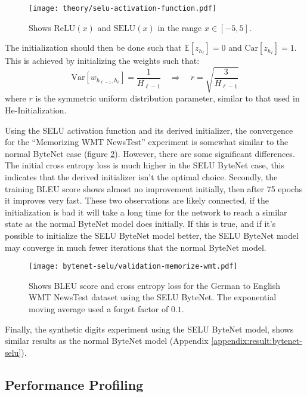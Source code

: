 \begin{figure}[h]
    \centering
    \texttt{[image: theory/selu-activation-function.pdf]}
    \caption{Shows $\mathrm{ReLU}(x)$ and $\mathrm{SELU}(x)$ in the range $x \in [-5, 5]$.}
    \label{fig:result:selu-bytenet:bytenet-selu-activation}
\end{figure}

The initialization should then be done such that $\mathbb{E}[z_{h_\ell}] = 0$ and $\mathrm{Car}[z_{h_\ell}] = 1$. This is achieved by initializing the weights such that:
\begin{equation}
\mathrm{Var}[w_{h_{\ell-1}, h_{\ell}}] = \frac{1}{H_{\ell-1}} \quad \Rightarrow \quad r = \sqrt{\frac{3}{H_{\ell-1}}}
\end{equation}
where $r$ is the symmetric uniform distribution parameter, similar to that used in He-Initialization.

Using the SELU activation function and its derived initializer, the convergence for the ``Memorizing WMT NewsTest'' experiment is somewhat similar to the normal ByteNet case (figure \ref{fig:result:selu-bytenet:bytenet-selu-wmt}). However, there are some significant differences. The initial cross entropy loss is much higher in the SELU ByteNet case, this indicates that the derived initializer isn't the optimal choice. Secondly, the training BLEU score shows almost no improvement initially, then after 75 epochs it improves very fast. These two observations are likely connected, if the initialization is bad it will take a long time for the network to reach a similar state as the normal ByteNet model does initially. If this is true, and if it's possible to initialize the SELU ByteNet model better, the SELU ByteNet model may converge in much fewer iterations that the normal ByteNet model.

\begin{figure}[h]
    \centering
    \texttt{[image: bytenet-selu/validation-memorize-wmt.pdf]}
    \caption{Shows BLEU score and cross entropy loss for the German to English WMT NewsTest dataset using the SELU ByteNet. The exponential moving average used a forget factor of $0.1$.}
    \label{fig:result:selu-bytenet:bytenet-selu-wmt}
\end{figure}

Finally, the synthetic digits experiment using the SELU ByteNet model, shows similar results as the normal ByteNet model (Appendix \ref{appendix:result:bytenet-selu}).

\clearpage
\subsection{Performance Profiling}

